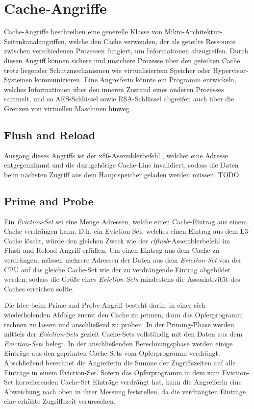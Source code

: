 \section{Cache-Angriffe}

Cache-Angriffe beschreiben eine generelle Klasse von Mikro-Architektur-Seitenkanalangriffen, welche den Cache verwenden, der als geteilte Ressource zwischen verschiedenen Prozessen fungiert, um Informationen abzugreifen. Durch diesen Angriff können sichere und unsichere Prozesse über den geteilten Cache trotz liegender Schutzmechanismen wie virtualisiertem Speicher oder Hypervisor-Systemen kommunizieren. 
Eine Angreiferin könnte ein Programm entwickeln, welches Informationen über den inneren Zustand eines anderen Prozesses sammelt, und so AES-Schlüssel \cite{BernsteinAES} sowie RSA-Schlüssel \cite{CacheAttackRSA} abgreifen auch über die Grenzen von virtuellen Maschinen hinweg.

\subsection{Flush and Reload}

Ausgang dieses Angriffs ist der x86-Assemblerbefehl , welcher eine Adresse entgegennimmt und die dazugehörige Cache-Line invalidiert, sodass die Daten beim nächsten Zugriff aus dem Hauptspeicher geladen werden müssen. TODO

\subsection{Prime and Probe}

Ein \textit{Eviction-Set} sei eine Menge Adressen, welche einen Cache-Eintrag aus einem Cache verdrängen kann. D.h. ein Eviction-Set, welches einen Eintrag aus dem L3-Cache löscht, würde den gleichen Zweck wie der \textit {clflush}-Assemblerbefehl im Flush-and-Reload-Angriff erfüllen. 
Um einen Eintrag aus dem Cache zu verdrängen, müssen mehrere Adressen der Daten aus dem \textit{Eviction-Set} von der CPU auf das gleiche Cache-Set wie der zu verdrängende Eintrag abgebildet werden, sodass die Größe eines \textit{Eviction-Sets} mindestens die Assoziativität des Caches erreichen sollte.

Die Idee beim Prime and Probe Angriff besteht darin, in einer sich wiederholenden Abfolge zuerst den Cache zu primen, dann das Opferprogramm rechnen zu lassen und anschließend zu proben.
In der Priming-Phase werden mittels der \textit{Eviction-Sets} gezielt Cache-Sets vollständig mit den Daten aus dem \textit{Eviction-Sets} belegt.
In der anschließenden Berechnungsphase werden einige Einträge aus den geprimten Cache-Sets vom Opferprogramm verdrängt. Abschließend berechnet die Angreiferin die Summe der Zugriffszeiten auf alle Einträge in einem Eviction-Set.
Sofern das Opferprogramm in dem zum Eviction-Set korrelierenden Cache-Set Einträge verdrängt hat, kann die Angreiferin eine Abweichung nach oben in ihrer Messung feststellen, da die verdrängten Einträge eine erhöhte Zugriffszeit verursachen.

